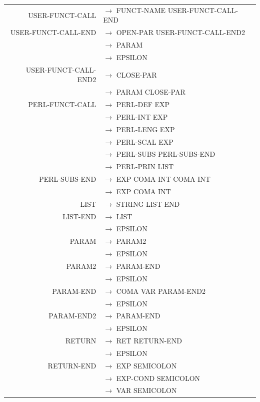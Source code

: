 \documentclass[a4paper,10pt]{article}
\begin{document}
\begin{tabular}{rl}
USER-FUNCT-CALL		& $\rightarrow$ FUNCT-NAME USER-FUNCT-CALL-END\\ 

USER-FUNCT-CALL-END	& $\rightarrow$ OPEN-PAR USER-FUNCT-CALL-END2\\ 
					& $\rightarrow$ PARAM\\ 
					& $\rightarrow$ EPSILON\\
					
USER-FUNCT-CALL-END2& $\rightarrow$ CLOSE-PAR\\ 
					& $\rightarrow$ PARAM CLOSE-PAR\\ 

				
PERL-FUNCT-CALL		& $\rightarrow$ PERL-DEF EXP \\
					& $\rightarrow$ PERL-INT EXP \\
					& $\rightarrow$ PERL-LENG EXP \\ 
					& $\rightarrow$ PERL-SCAL EXP \\
					& $\rightarrow$ PERL-SUBS PERL-SUBS-END \\
					& $\rightarrow$ PERL-PRIN LIST \\ 
					
PERL-SUBS-END		& $\rightarrow$ EXP COMA INT COMA INT \\
					& $\rightarrow$ EXP COMA INT  \\
					
LIST				& $\rightarrow$ STRING LIST-END\\
					
LIST-END			& $\rightarrow$ LIST\\
					& $\rightarrow$ EPSILON\\
				

					
PARAM				& $\rightarrow$ PARAM2\\
					& $\rightarrow$ EPSILON \\

PARAM2				& $\rightarrow$ PARAM-END\\
					& $\rightarrow$ EPSILON \\
					
					
PARAM-END			& $\rightarrow$ COMA VAR PARAM-END2\\ 
					& $\rightarrow$ EPSILON \\
					
PARAM-END2			& $\rightarrow$ PARAM-END\\ 
					& $\rightarrow$ EPSILON \\

RETURN				& $\rightarrow$ RET RETURN-END\\
					& $\rightarrow$ EPSILON \\

RETURN-END			& $\rightarrow$ EXP SEMICOLON\\
					& $\rightarrow$ EXP-COND SEMICOLON\\
					& $\rightarrow$ VAR SEMICOLON\\

					
					
					



					
					
\end{tabular}
\end{document}
